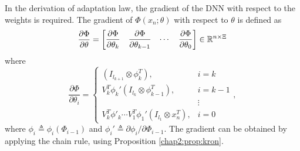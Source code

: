 In the derivation of adaptation law, the gradient of the DNN with respect to the weights is required.
The gradient of $ \Phi(x_n;\theta)$ with respect to $\theta$ is defined as
\begin{equation}
    {\partial\Phi\over\partial \theta}=
    \begin{bmatrix}
        \dfrac{\partial \Phi}{\partial \theta_k}&
        \dfrac{\partial \Phi}{\partial \theta_{k-1}}&
    \cdots &
        \dfrac{\partial \Phi}{\partial \theta_0}
    \end{bmatrix}
    \in\mathbb{R}^{n \times \Xi}
    \label{chap2:eq:DNNgrad}
\end{equation}
where
\begin{equation}
    \frac{\partial \Phi}{\partial \theta_i} = 
    \begin{cases}
        (I_{l_{k+1}}\otimes \phi_{k}^T  ), & i=k \\
        V_k^T   \phi_{k}' (I_{l_{k}}\otimes  \phi_{k-1}^T  ), & i=k-1\\
        &\vdots \\
        V_k^T   \phi'_{k} \cdots V_1^T  \phi_1' (I_{l_1}\otimes x_n^T  ), & i = 0
    \end{cases},
\end{equation}
where $\phi_i\triangleq \phi_i(\Phi_{i-1})$ and $\phi_i'\triangleq \partial \phi_i/\partial \Phi_{i-1}$.
The gradient can be obtained by applying the chain rule, using Proposition \ref{chap2:prop:kron}.
